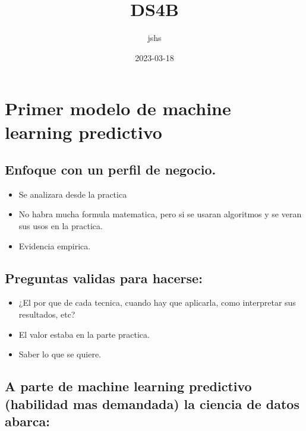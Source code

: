 \documentclass[
]{article}
\title{DS4B}
\author{jshs}
\date{2023-03-18}
\providecommand{\tightlist}{%
  \setlength{\itemsep}{0pt}\setlength{\parskip}{0pt}}
\begin{document}
\maketitle

\hypertarget{primer-modelo-de-machine-learning-predictivo}{%
\section{Primer modelo de machine learning
predictivo}\label{primer-modelo-de-machine-learning-predictivo}}

\hypertarget{enfoque-con-un-perfil-de-negocio.}{%
\subsection{Enfoque con un perfil de
negocio.}\label{enfoque-con-un-perfil-de-negocio.}}

\begin{itemize}
\tightlist
\item
  Se analizara desde la practica
\item
  No habra mucha formula matematica, pero si se usaran algoritmos y se
  veran sus usos en la practica.
\item
  Evidencia empirica.
\end{itemize}

\hypertarget{preguntas-validas-para-hacerse}{%
\subsection{Preguntas validas para
hacerse:}\label{preguntas-validas-para-hacerse}}

\begin{itemize}
\tightlist
\item
  ¿El por que de cada tecnica, cuando hay que aplicarla, como
  interpretar sus resultados, etc?
\item
  El valor estaba en la parte practica.
\item
  Saber lo que se quiere.
\end{itemize}

\hypertarget{a-parte-de-machine-learning-predictivo-habilidad-mas-demandada-la-ciencia-de-datos-abarca}{%
\subsection{A parte de machine learning predictivo (habilidad mas
demandada) la ciencia de datos
abarca:}\label{a-parte-de-machine-learning-predictivo-habilidad-mas-demandada-la-ciencia-de-datos-abarca}}
\end{document}
